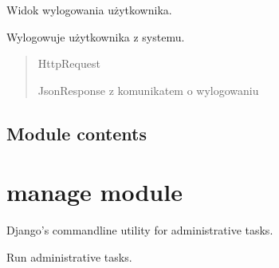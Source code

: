 \documentclass[letterpaper,10pt,polish]{sphinxmanual}
\begin{document}
\begin{fulllineitems}
\label{\detokenize{mainApp:mainApp.views.user_logout}}
\pysigstartsignatures
{}
\pysigstopsignatures
\sphinxAtStartPar
Widok wylogowania użytkownika.

\sphinxAtStartPar
Wylogowuje użytkownika z systemu.
\begin{quote}\begin{description}
\sphinxAtStartPar
{} \textendash{} HttpRequest

\sphinxAtStartPar
JsonResponse z komunikatem o wylogowaniu

\end{description}\end{quote}

\end{fulllineitems}



\subsection{Module contents}
\label{\detokenize{mainApp:module-mainApp}}\label{\detokenize{mainApp:module-contents}}
\sphinxstepscope


\section{manage module}
\label{\detokenize{manage:module-manage}}\label{\detokenize{manage:manage-module}}\label{\detokenize{manage::doc}}
\sphinxAtStartPar
Django’s command\sphinxhyphen{}line utility for administrative tasks.

\begin{fulllineitems}
\label{\detokenize{manage:manage.main}}
\pysigstartsignatures
{}
\pysigstopsignatures
\sphinxAtStartPar
Run administrative tasks.

\end{fulllineitems}
\end{document}
